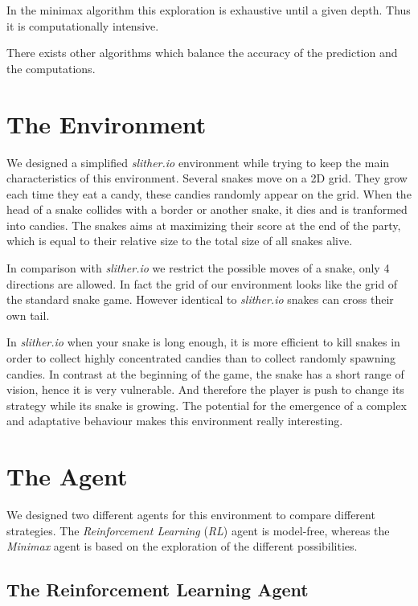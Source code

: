 \documentclass[journal, a4paper]{IEEEtran}
\begin{document}
In the minimax algorithm this exploration is exhaustive until a given depth. Thus it is computationally intensive.

There exists other algorithms which balance the accuracy of the prediction and the computations.

\section{The Environment}
We designed a simplified \emph{slither.io} environment while trying to keep the main characteristics of this environment. Several snakes move on a 2D grid. They grow each time they eat a candy, these candies randomly appear on the grid. When the head of a snake collides with a border or another snake, it dies and is tranformed into candies. The snakes aims at maximizing their score at the end of the party, which is equal to their relative size to the total size of all snakes alive.

In comparison with \emph{slither.io} we restrict the possible moves of a snake, only 4 directions are allowed. In fact the grid of our environment looks like the grid of the standard snake game. However identical to \emph{slither.io} snakes can cross their own tail.

In \emph{slither.io} when your snake is long enough, it is more efficient to kill snakes in order to collect highly concentrated candies than to collect randomly spawning candies. In contrast at the beginning of the game, the snake has a short range of vision, hence it is very vulnerable. And therefore the player is push to change its strategy while its snake is growing. The potential for the emergence of a complex and adaptative behaviour makes this environment really interesting.

\section{The Agent}

We designed two different agents for this environment to compare different strategies.
The \emph{Reinforcement Learning} (\emph{RL}) agent is model-free, whereas the \emph{Minimax} agent is based on the exploration of the different possibilities.

\subsection{The Reinforcement Learning Agent\label{rl_agent}}
\end{document}
